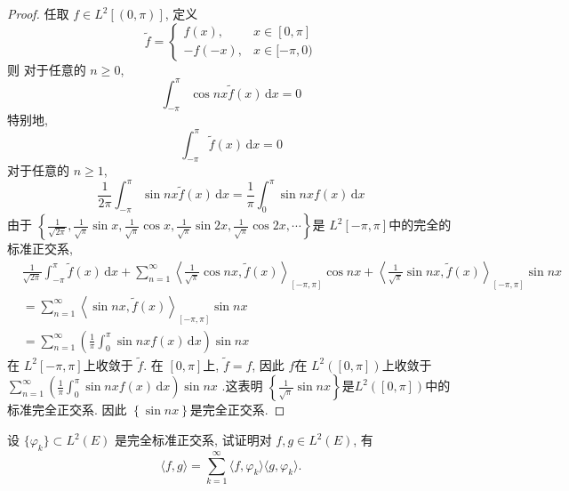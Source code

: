 \documentclass[../main.tex]{subfiles}
\begin{document}
\begin{proof}
    任取 \(  f\in L^{2}[\left( 0, \pi  \right) ]  \), 定义 \[
    \tilde{f}= \begin{cases} f\left( x \right),&x\in [0, \pi ]\\ 
     -f\left( -x \right),&x\in [- \pi ,0)   \end{cases} 
    \] 则 对于任意的 \(  n\ge 0  \), \[
    \int_{- \pi }^{ \pi }\cos nx \tilde{f}\left( x \right)\,\mathrm{d} x= 0 
    \]特别地,  \[
    \int_{- \pi }^{ \pi }\tilde{f}\left( x \right)\,\mathrm{d} x= 0 
    \] 对于任意的 \(  n\ge 1  \),  \[
    \frac{1 }{2 \pi  } \int_{- \pi }^{ \pi }\sin nx \tilde{f}\left( x \right)\,\mathrm{d} x= \frac{1 }{ \pi  } \int_{0}^{ \pi }\sin nxf\left( x \right)\,\mathrm{d} x  
    \] 由于 \(  \left\{ \frac{1 }{\sqrt{2 \pi}  } ,\frac{1 }{\sqrt{ \pi } }  \sin x, \frac{1 }{\sqrt{ \pi } } \cos x,\frac{1 }{\sqrt{ \pi } } \sin 2x,\frac{1 }{\sqrt{ \pi } } \cos 2x,\cdots  \right\}  \)是 \(  L^{2}[- \pi , \pi ]  \)中的完全的标准正交系,  \[
   \begin{aligned}
   & \frac{1 }{\sqrt{2 \pi } }\int_{- \pi }^{ \pi }\tilde{f}\left( x \right)\,\mathrm{d} x+ \sum _{ n = 1}^{\infty}\left<\frac{1 }{\sqrt{ \pi } } \cos nx, \tilde{f}\left( x \right)  \right>_{[- \pi , \pi] }\cos nx+ \left<\frac{1 }{\sqrt{ \pi } } \sin nx, \tilde{f}\left( x \right)  \right>_{[- \pi , \pi ]}\sin nx   \\ 
    &= \sum _{n = 1}^{\infty}\left<\sin nx, \tilde{f}\left( x \right)  \right>_{[- \pi , \pi ]}\sin  nx\\ 
     &= \sum _{n = 1}^{\infty}\left( \frac{1 }{ \pi  }\int_{0}^{ \pi }\sin nxf\left( x \right)\,\mathrm{d} x  \right) \sin nx  
   \end{aligned}
    \]  在 \(  L^{2}[- \pi , \pi ]  \)上收敛于 \(  \tilde{f}  \). 在 \(  [0, \pi ]  \)上,  \(  \tilde{f}= f  \), 因此 \(  f  \)在 \(  L^{2}\left( [0, \pi ] \right)   \)上收敛于 \(  \sum _{n =1}^{\infty}\left( \frac{1 }{ \pi  }\int_{0}^{ \pi }\sin nxf\left( x \right)\,\mathrm{d} x   \right)\sin nx   \)      .这表明 \(  \left\{ \frac{1 }{\sqrt{ \pi } }\sin nx  \right\}  \)是\(  L^{2}\left( [0, \pi ] \right)   \)中的标准完全正交系. 因此 \(  \left\{ \sin nx \right\}  \)是完全正交系.   
\end{proof}
\begin{exercise}{}{}
设 $\{\varphi_k\} \subset L^2(E)$ 是完全标准正交系, 试证明对 $f, g \in L^2(E)$, 有
\[ \langle f, g \rangle = \sum_{k=1}^\infty \langle f, \varphi_k \rangle \langle g, \varphi_k \rangle. \]
\end{exercise}
\end{document}
